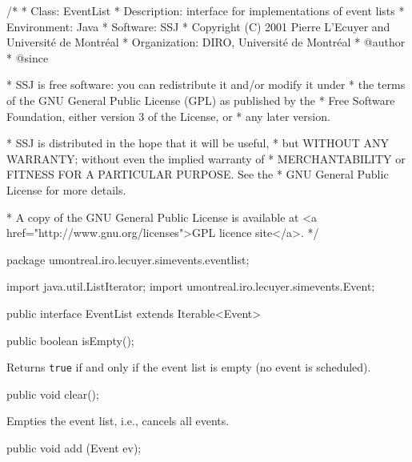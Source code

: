 \begin{code}
\begin{hide}
/*
 * Class:        EventList
 * Description:  interface for implementations of event lists
 * Environment:  Java
 * Software:     SSJ 
 * Copyright (C) 2001  Pierre L'Ecuyer and Université de Montréal
 * Organization: DIRO, Université de Montréal
 * @author       
 * @since

 * SSJ is free software: you can redistribute it and/or modify it under
 * the terms of the GNU General Public License (GPL) as published by the
 * Free Software Foundation, either version 3 of the License, or
 * any later version.

 * SSJ is distributed in the hope that it will be useful,
 * but WITHOUT ANY WARRANTY; without even the implied warranty of
 * MERCHANTABILITY or FITNESS FOR A PARTICULAR PURPOSE.  See the
 * GNU General Public License for more details.

 * A copy of the GNU General Public License is available at
   <a href="http://www.gnu.org/licenses">GPL licence site</a>.
 */
\end{hide}
package umontreal.iro.lecuyer.simevents.eventlist; \begin{hide}

import java.util.ListIterator; 
import umontreal.iro.lecuyer.simevents.Event;
\end{hide}

public interface EventList extends Iterable<Event>\begin{hide} {
\end{hide}
 
   public boolean isEmpty();
\end{code}
 \begin{tabb}  Returns {\tt true} if and only if the event list is empty
   (no event is scheduled).
 \end{tabb}
\begin{htmlonly}
\end{htmlonly}
\begin{code}

   public void clear();
\end{code}
 \begin{tabb}  Empties the event list, i.e., cancels all events.
 \end{tabb}
\begin{code}

   public void add (Event ev);
\end{code}
